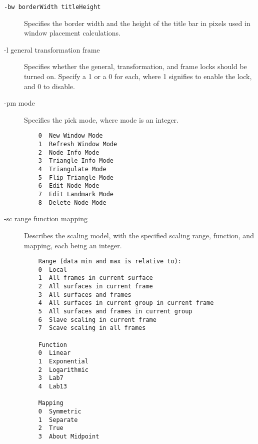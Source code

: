 \begin{description}
  \item[{\tt-bw borderWidth titleHeight}] Specifies the border width and the 
    height of the title bar in pixels used in window placement calculations.
    
  \item[{-l general transformation frame}] Specifies whether the general, 
    transformation, and frame locks should be turned on.  Specify a 1 or
    a 0 for each, where 1 signifies to enable the lock, and 0 to disable.

  \item[{-pm mode}] Specifies the pick mode, where mode is an integer.
    \begin{verbatim}
    0  New Window Mode
    1  Refresh Window Mode
    2  Node Info Mode
    3  Triangle Info Mode
    4  Triangulate Mode
    5  Flip Triangle Mode
    6  Edit Node Mode
    7  Edit Landmark Mode
    8  Delete Node Mode
    \end{verbatim}
    
  \item[{-sc range function mapping}]  Describes the scaling model, with the specified 
    scaling range, function, and mapping, each being an integer.
    \begin{verbatim}
    Range (data min and max is relative to):
    0  Local
    1  All frames in current surface
    2  All surfaces in current frame
    3  All surfaces and frames
    4  All surfaces in current group in current frame
    5  All surfaces and frames in current group
    6  Slave scaling in current frame
    7  Scave scaling in all frames
    
    Function
    0  Linear
    1  Exponential
    2  Logarithmic
    3  Lab7
    4  Lab13
    
    Mapping
    0  Symmetric
    1  Separate
    2  True
    3  About Midpoint
    \end{verbatim}
  \end{description}
  
